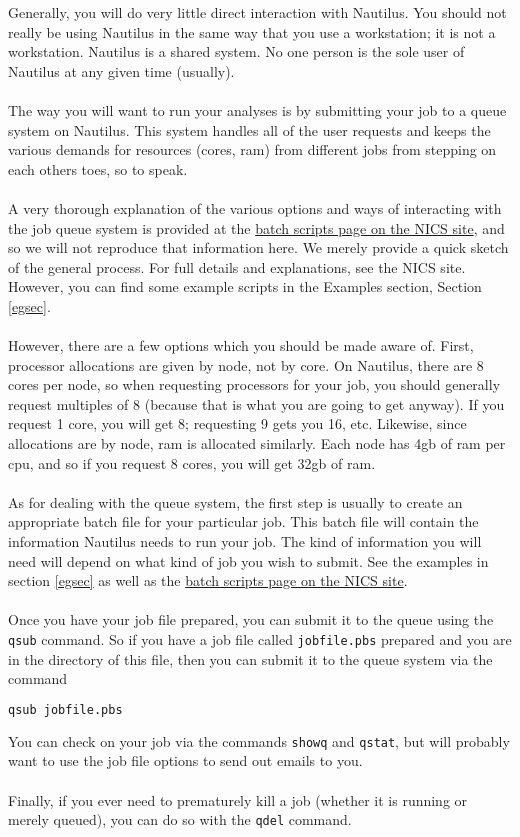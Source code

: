 \label{jqssec}
Generally, you will do very little direct interaction with Nautilus.  You should not really be using Nautilus in the same way that you use a workstation; it is not a workstation.  Nautilus is a shared system.  No one person is the sole user of Nautilus at any given time (usually).  \\\\
%
The way you will want to run your analyses is by submitting your job to a queue system on Nautilus.  This system handles all of the user requests and keeps the various demands for resources (cores, ram) from different jobs from stepping on each others toes, so to speak.\\\\
%
A very thorough explanation of the various options and ways of interacting with the job queue system is provided at the \href{http://www.nics.tennessee.edu/computing-resources/nautilus/Batch_Scripts}{batch scripts page on the NICS site}, and so we will not reproduce that information here.  We merely provide a quick sketch of the general process.  For full details and explanations, see the NICS site.  However, you can find some example scripts in the Examples section, Section \ref{egsec}.\\\\
%
However, there are a few options which you should be made aware of.  First, processor allocations are given by node, not by core.  On Nautilus, there are 8 cores per node, so when requesting processors for your job, you should generally request multiples of 8 (because that is what you are going to get anyway).  If you request 1 core, you will get 8; requesting 9 gets you 16, etc.  Likewise, since allocations are by node, ram is allocated similarly.  Each node has 4gb of ram per cpu, and so if you request 8 cores, you will get 32gb of ram.\\\\
%
As for dealing with the queue system, the first step is usually to create an appropriate batch file for your particular job.  This batch file will contain the information Nautilus needs to run your job.  The kind of information you will need will depend on what kind of job you wish to submit.  See the examples in section \ref{egsec} as well as the \href{http://www.nics.tennessee.edu/computing-resources/nautilus/Batch_Scripts}{batch scripts page on the NICS site}.\\\\
%
Once you have your job file prepared, you can submit it to the queue using the \texttt{qsub} command.  So if you have a job file called \texttt{jobfile.pbs} prepared and you are in the directory of this file, then you can submit it to the queue system via the command
\begin{lstlisting}[language=sh]
qsub jobfile.pbs 
\end{lstlisting}%
You can check on your job via the commands \texttt{showq} and \texttt{qstat}, but will probably want to use the job file options to send out emails to you.\\\\
%
Finally, if you ever need to prematurely kill a job (whether it is running or merely queued), you can do so with the \texttt{qdel} command.